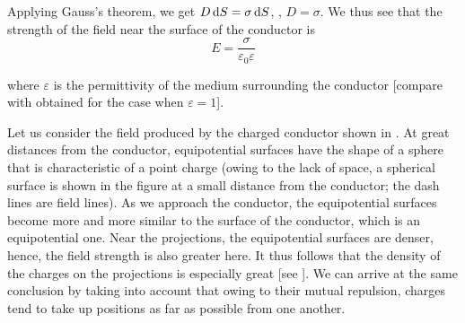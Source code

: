 Applying Gauss's theorem, we get $D\,\mathrm{d} S=\sigma\,\mathrm{d} S$, \ie, $D=\sigma$. We thus see that the strength of the field near the surface of the conductor is
\begin{equation}\label{eq:3_3}
    E = \frac{\sigma}{\varepsilon_0\varepsilon}
\end{equation}

\noindent
where $\varepsilon$ is the permittivity of the medium surrounding the conductor [compare with  obtained for the case when $\varepsilon=1$].

Let us consider the field produced by the charged conductor shown in . At great distances from the conductor, equipotential surfaces have the shape of a sphere that is characteristic of a point charge (owing to the lack of space, a spherical surface is shown in the figure at a small distance from the conductor; the dash lines are field lines). As we approach the conductor, the equipotential surfaces become more and more similar to the surface of the conductor, which is an equipotential one. Near the projections, the equipotential surfaces are denser, hence, the field strength is also greater here. It thus follows that the density of the charges on the projections is especially great [see ]. We can arrive at the same conclusion by taking into account that owing to their mutual repulsion, charges tend to take up positions as far as possible from one another.

